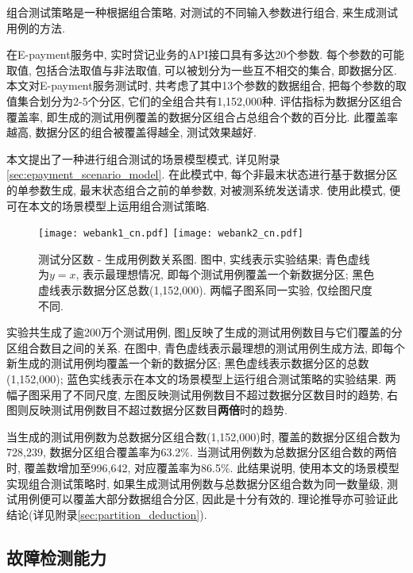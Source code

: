                 组合测试策略\cite{grindal2005combination}是一种根据组合策略, 对测试的不同输入参数进行组合, 来生成测试用例的方法.
                
                在E-payment服务中, 实时贷记业务的API接口具有多达20个参数. 每个参数的可能取值, 包括合法取值与非法取值, 可以被划分为一些互不相交的集合, 即数据分区. 本文对E-payment服务测试时, 共考虑了其中13个参数的数据组合, 把每个参数的取值集合划分为2-5个分区,  它们的全组合共有1,152,000种. 评估指标为数据分区组合覆盖率, 即生成的测试用例覆盖的数据分区组合占总组合个数的百分比. 此覆盖率越高, 数据分区的组合被覆盖得越全, 测试效果越好. 
                
                本文提出了一种进行组合测试的场景模型模式, 详见附录\ref{sec:epayment_scenario_model}. 在此模式中, 每个非最末状态进行基于数据分区的单参数生成, 最末状态组合之前的单参数, 对被测系统发送请求. 使用此模式, 便可在本文的场景模型上运用组合测试策略.
                
                \begin{figure}[!htb]
                    \centering
                    \texttt{[image: webank1\_cn.pdf]}
                    \texttt{[image: webank2\_cn.pdf]}
                    \caption{测试分区数 - 生成用例数关系图. 图中, 实线表示实验结果; 青色虚线为$y=x$, 表示最理想情况, 即每个测试用例覆盖一个新数据分区; 黑色虚线表示数据分区总数(1,152,000). 两幅子图系同一实验, 仅绘图尺度不同.}
                    \label{fig:partition}
                \end{figure}
                
                实验共生成了逾200万个测试用例, 图\ref{fig:partition}反映了生成的测试用例数目与它们覆盖的分区组合数目之间的关系. 在图中, 青色虚线表示最理想的测试用例生成方法, 即每个新生成的测试用例均覆盖一个新的数据分区; 黑色虚线表示数据分区的总数(1,152,000); 蓝色实线表示在本文的场景模型上运行组合测试策略的实验结果. 两幅子图采用了不同尺度, 左图反映测试用例数目不超过数据分区数目时的趋势, 右图则反映测试用例数目不超过数据分区数目\textbf{两倍}时的趋势.
                
                当生成的测试用例数为总数据分区组合数(1,152,000)时, 覆盖的数据分区组合数为728,239, 数据分区组合覆盖率为63.2\%. 当测试用例数为总数据分区组合数的两倍时, 覆盖数增加至996,642, 对应覆盖率为86.5\%. 此结果说明, 使用本文的场景模型实现组合测试策略时, 如果生成测试用例数与总数据分区组合数为同一数量级, 测试用例便可以覆盖大部分数据组合分区, 因此是十分有效的. 理论推导亦可验证此结论(详见附录\ref{sec:partition_deduction}).
    
        \subsection{故障检测能力}
        
